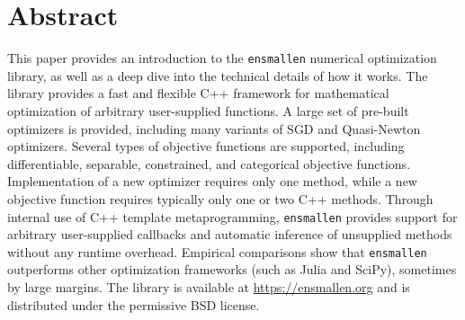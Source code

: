 \section*{Abstract}
This paper provides an introduction to the {\tt ensmallen} numerical optimization library,
as well as a deep dive into the technical details of how it works.
The library provides a fast and flexible C++ framework
for mathematical optimization of arbitrary user-supplied functions.
A large set of pre-built optimizers is provided,
including many variants of SGD and Quasi-Newton optimizers.
Several types of objective functions are supported, including differentiable,
separable, constrained, and categorical objective functions.
Implementation of a new optimizer requires only one method,
while a new objective function requires typically only one or two C++ methods.
Through internal use of C++ template metaprogramming, {\tt ensmallen} provides support for arbitrary
user-supplied callbacks and automatic inference of unsupplied methods without
any runtime overhead.
Empirical comparisons show that {\tt ensmallen}
outperforms other optimization frameworks (such as Julia and SciPy), sometimes
by large margins.  The library is available at \url{https://ensmallen.org}
and is distributed under the permissive BSD license.



